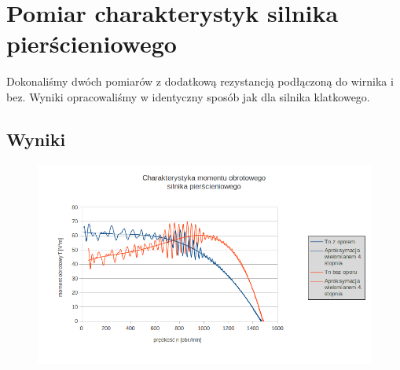 \documentclass[12pt]{article}
\newcommand{\ZMa}{17}
\begin{document}
\section{Pomiar charakterystyk silnika pierścieniowego}
Dokonaliśmy dwóch pomiarów z dodatkową rezystancją podłączoną do wirnika i bez. Wyniki opracowaliśmy w identyczny sposób jak dla silnika klatkowego.
\subsection{Wyniki}
	\begin{figure}[H]
	\centering
	\includegraphics[width=\ZMa cm]{ch_mechaniczna_pierscieniowy}
	\end{figure}
\end{document}
